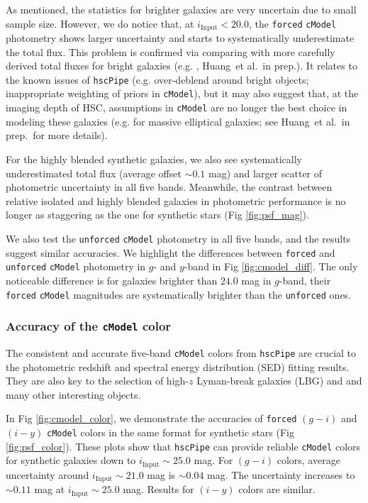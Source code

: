 \documentclass[useamsfonts]{pasj01}
\def\etal{{\ et al.~}}
\def\hscpipe{\texttt{hscPipe}}
\def\cmodel{\texttt{cModel}}
\def\forced{\texttt{forced}}
\def\unforced{\texttt{unforced}}
\begin{document}
    As mentioned, the statistics for brighter galaxies are very uncertain due to 
    small sample size. 
    However, we do notice that, at $i_{\mathrm{Input}}<20.0$, the \forced{} 
    \cmodel{} photometry shows larger uncertainty and starts to systematically 
    underestimate the total flux.  
    This problem is confirmed via comparing with more carefully derived total fluxes 
    for bright galaxies (e.g. \citealt{HSCDR1}, Huang\etal in prep.). 
    It relates to the known issues of \hscpipe{} (e.g. over-deblend around bright 
    objects; inappropriate weighting of priors in \cmodel{}), but it may also suggest
    that, at the imaging depth of HSC, assumptions in \cmodel{} are no longer the 
    best choice in modeling these galaxies (e.g. for massive elliptical galaxies; 
    see Huang\etal in prep.~for more details). 
    
    For the highly blended synthetic galaxies, we also see systematically 
    underestimated total flux (average offset ${\sim}0.1$ mag) and larger scatter 
    of photometric uncertainty in all five bands.  
    Meanwhile, the contrast between relative isolated and highly blended galaxies 
    in photometric performance is no longer as staggering as the one for synthetic
    stars (Fig \ref{fig:psf_mag}).
    
    We also test the \unforced{} \cmodel{} photometry in all five bands, and the 
    results suggest similar accuracies.
    We highlight the differences between \forced{} and \unforced{} \cmodel{} 
    photometry in $g$- and $y$-band in Fig \ref{fig:cmodel_diff}.
    The only noticeable difference is for galaxies brighter than $24.0$ mag in 
    $g$-band, their \forced{} \cmodel{} magnitudes are systematically brighter than 
    the \unforced{} ones. 
 
\subsubsection{Accuracy of the \cmodel{} color}

    The consistent and accurate five-band \cmodel{} colors from \hscpipe{} are crucial 
    to the photometric redshift and spectral energy distribution (SED) fitting results. 
    They are also key to the selection of high-$z$ Lyman-break galaxies (LBG) and 
    and many other interesting objects. 

    In Fig \ref{fig:cmodel_color}, we demonstrate the accuracies of \forced{} $(g-i)$
    and $(i-y)$ \cmodel{} colors in the same format for synthetic stars 
    (Fig \ref{fig:psf_color}).
    These plots show that \hscpipe{} can provide reliable \cmodel{} colors for 
    synthetic galaxies down to $i_{\mathrm{Input}}{\sim}25.0$ mag. 
    For $(g-i)$ colors, average uncertainty around $i_{\mathrm{Input}}{\sim}21.0$ mag 
    is ${\sim}0.04$ mag.
    The uncertainty increases to ${\sim}0.11$ mag at $i_{\mathrm{Input}}{\sim}25.0$ mag.
    Results for $(i-y)$ colors are similar.
    
\end{document}
